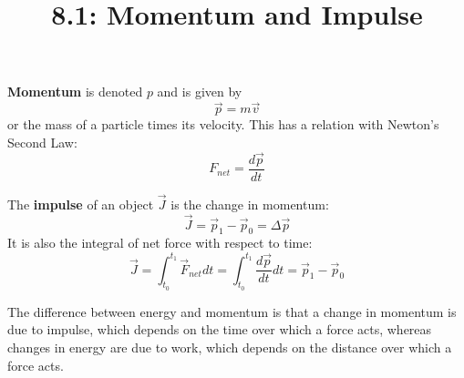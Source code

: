 \documentclass{article}
\title{8.1: Momentum and Impulse}
\begin{document}
\maketitle
\begin{definition}[Momentum]
\textbf{Momentum} is denoted $p$ and is given by $$\vec{p} = m\vec{v}$$or the mass of a particle times its velocity. This has a relation with Newton's Second Law: $$F_{net} = \frac{d\vec{p}}{dt}$$
\end{definition}

\begin{definition}[Impulse]
The \textbf{impulse} of an object $\vec{J}$ is the change in momentum: $$\vec{J} = \vec{p}_1 - \vec{p}_0 = \Delta \vec{p}$$It is also the integral of net force with respect to time: $$\vec{J} = \int_{t_0}^{t_1} \vec{F}_{net} dt = \int_{t_0}^{t_1} \frac{d\vec{p}}{dt} dt = \vec{p}_1 - \vec{p}_0$$
\end{definition}

The difference between energy and momentum is that a change in momentum is due to impulse, which depends on the time over which a force acts, whereas changes in energy are due to work, which depends on the distance over which a force acts.
\end{document}
